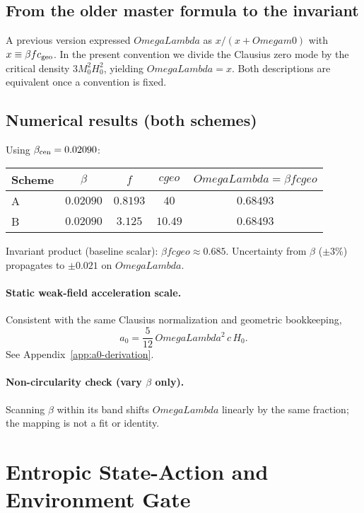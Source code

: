 \documentclass[aps,prd,onecolumn,superscriptaddress,nofootinbib]{revtex4-2}
\def\OmL{OmegaLambda}%
\def\Omm{Omega m0}%
\def\cgeo{cgeo}%
\newcommand{\OmL}{\Omega_\Lambda}
\newcommand{\Omm}{\Omega_{m0}}
\newcommand{\cgeo}{c_{\rm geo}}
\begin{document}
\subsection{From the older master formula to the invariant}
A previous version expressed $\OmL$ as $x/(x+\Omm)$ with $x\equiv \beta f c_{\rm geo}$. In the present convention we divide the Clausius zero mode by the critical density $3M_0^2H_0^2$, yielding $\OmL=x$. Both descriptions are equivalent once a convention is fixed.

\subsection{Numerical results (both schemes)}
\label{sec:numerics}
Using $\beta_{\rm cen}=0.02090$:
\begin{center}
\begin{tabular}{l|c|c|c|c}
\hline
Scheme & $\beta$ & $f$ & $\cgeo$ & $\OmL=\beta f \cgeo$ \\
\hline
A & $0.02090$ & $0.8193$ & $40$ & $0.68493$ \\
B & $0.02090$ & $3.125$ & $10.49$ & $0.68493$ \\
\hline
\end{tabular}
\end{center}
Invariant product (baseline scalar): $\beta f \cgeo \approx 0.685$. Uncertainty from $\beta$ ($\pm3\%$) propagates to $\pm 0.021$ on $\OmL$.

\paragraph*{Static weak-field acceleration scale.}
Consistent with the same Clausius normalization and geometric bookkeeping,
\begin{equation}
a_0 = \frac{5}{12}\,\OmL^2\,c\,H_0.
\end{equation}
See Appendix~\ref{app:a0-derivation}.

\paragraph*{Non-circularity check (vary $\beta$ only).}
Scanning $\beta$ within its band shifts $\OmL$ linearly by the same fraction; the mapping is not a fit or identity.

\section{Entropic State-Action and Environment Gate}
\label{sec:state-action}
\end{document}
